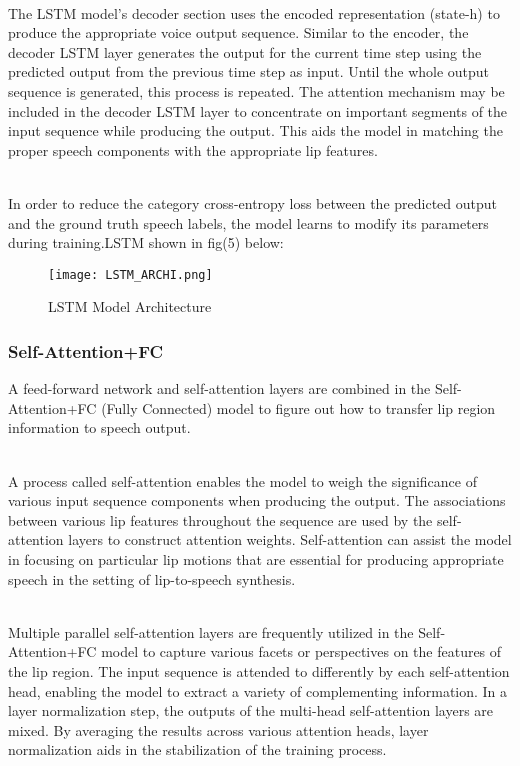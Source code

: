 \documentclass[conference]{IEEEtran}
\begin{document}
\\ The LSTM model's decoder section uses the encoded representation (state-h) to produce the appropriate voice output sequence. Similar to the encoder, the decoder LSTM layer generates the output for the current time step using the predicted output from the previous time step as input. Until the whole output sequence is generated, this process is repeated. The attention mechanism may be included in the decoder LSTM layer to concentrate on important segments of the input sequence while producing the output. This aids the model in matching the proper speech components with the appropriate lip features.

\\ In order to reduce the category cross-entropy loss between the predicted output and the ground truth speech labels, the model learns to modify its parameters during training.LSTM shown in fig(5) below:

\begin{figure}[htbp]
\centerline{\texttt{[image: LSTM\_ARCHI.png]}}
\caption{LSTM Model Architecture}
\label{fig}
\end{figure}

\subsubsection{Self-Attention+FC}
A feed-forward network and self-attention layers are combined in the Self-Attention+FC (Fully Connected) model to figure out how to transfer lip region information to speech output.

\\ A process called self-attention enables the model to weigh the significance of various input sequence components when producing the output.
The associations between various lip features throughout the sequence are used by the self-attention layers to construct attention weights. Self-attention can assist the model in focusing on particular lip motions that are essential for producing appropriate speech in the setting of lip-to-speech synthesis.

\\ Multiple parallel self-attention layers are frequently utilized in the Self-Attention+FC model to capture various facets or perspectives on the features of the lip region. The input sequence is attended to differently by each self-attention head, enabling the model to extract a variety of complementing information. In a layer normalization step, the outputs of the multi-head self-attention layers are mixed. By averaging the results across various attention heads, layer normalization aids in the stabilization of the training process.
\end{document}
